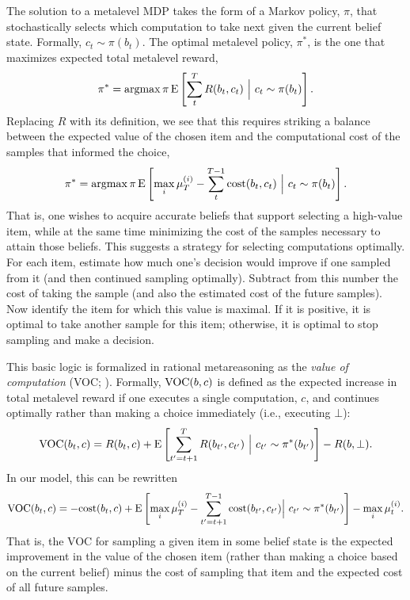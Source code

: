 
The solution to a metalevel MDP takes the form of a Markov policy, $\pi$, that stochastically selects which computation to take next given the current belief state. Formally, $c_t \sim \pi(b_t)$. The optimal metalevel policy, $\pi^*$, is the one that maximizes expected total metalevel reward,
\begin{equation*}
  \pi^* = \operatorname*{argmax}{\pi} \operatorname*{E} \left[ \sum_t^T R(b_t, c_t) \ \Big\vert\ c_t \sim \pi(b_t) \right].
\end{equation*}
Replacing $R$ with its definition, we see that this requires striking a balance between the expected value of the chosen item and the computational cost of the samples that informed the choice,
\begin{equation*}
  \pi^* = \operatorname*{argmax}{\pi} \operatorname*{E} \left[
     \max_i \mu_T^{(i)} - \sum_t^{T-1} \text{cost}(b_t, c_t)
   \ \Big\vert\ c_t \sim \pi(b_t) \right].
\end{equation*}
That is, one wishes to acquire accurate beliefs that support selecting a high-value item, while at the same time minimizing the cost of the samples necessary to attain those beliefs. This suggests a strategy for selecting computations optimally. For each item, estimate how much one's decision would improve if one sampled from it (and then continued sampling optimally). Subtract from this number the cost of taking the sample (and also the estimated cost of the future samples). Now identify the item for which this value is maximal. If it is positive, it is optimal to take another sample for this item; otherwise, it is optimal to stop sampling and make a decision.

This basic logic is formalized in rational metareasoning as the \textit{value of computation} (VOC; \citealp{russell1991principles}). Formally, $\text{VOC}(b, c)$ is defined as the expected increase in total metalevel reward if one executes a single computation, $c$, and continues optimally rather than making a choice immediately (i.e., executing $\bot$):
$$
\text{VOC}(b_t, c) = R(b_t, c) + \operatorname*{E} \left[
  \sum_{t'=t+1}^T R(b_{t'}, c_{t'})\ \Big\vert\ c_{t'} \sim \pi^*(b_{t'}) 
\right] - R(b, \bot).
$$
In our model, this can be rewritten
$$
\text{VOC}(b_t, c) = -\text{cost}(b_t, c) + \operatorname*{E} \left[ 
  \max_i \mu_T^{(i)} - \sum_{t'=t+1}^{T-1} \text{cost}(b_{t'}, c_{t'})
  \Big\vert\ c_{t'} \sim \pi^*(b_{t'})
\right] -  \max_i \mu_t^{(i)}.
$$
That is, the VOC for sampling a given item in some belief state is the expected improvement in the value of the chosen item (rather than making a choice based on the current belief) minus the cost of sampling that item and the expected cost of all future samples.

